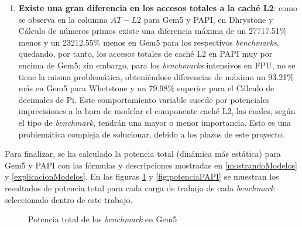 \begin{enumerate}
    \item \textbf{Existe una gran diferencia en los accesos totales a la caché L2}: como se observa en la columna $AT-L2$ para Gem5 y PAPI, en Dhrystone y Cálculo de números primos existe una diferencia máxima de un 27717.51\% menos y un 23212.55\% menos en Gem5 para los respectivos \textit{benchmarks}, quedando, por tanto, los accesos totales de caché L2 en PAPI muy por encima de Gem5; sin embargo, para los \textit{benchmarks} intensivos en \ac{FPU}, no se tiene la misma problemática, obteniéndose diferencias de máximo un 93.21\% más en Gem5 para Whetstone y un 79.98\% superior para el Cálculo de decimales de Pi. Este comportamiento variable sucede por potenciales imprecisiones a la hora de modelar el componente caché L2, las cuales, según el tipo de \textit{benchmark}, tendrán una mayor o menor importancia. Esto es una problemática compleja de solucionar, debido a los plazos de este proyecto.
\end{enumerate}

Para finalizar, se ha calculado la potencia total (dinámica más estática) para Gem5 y PAPI con las fórmulas y descripciones mostradas en \ref{mostrandoModelos} y \ref{explicacionModelos}. En las figuras \ref{fig:potenciaGem5} y \ref{fig:potenciaPAPI} se muestran los resultados de potencia total para cada carga de trabajo de cada \textit{benchmark} seleccionado dentro de este trabajo.

\begin{figure}[H]
    \centering
    \caption{Potencia total de los \textit{benchmark} en Gem5}
    \label{fig:potenciaGem5}
\end{figure}

